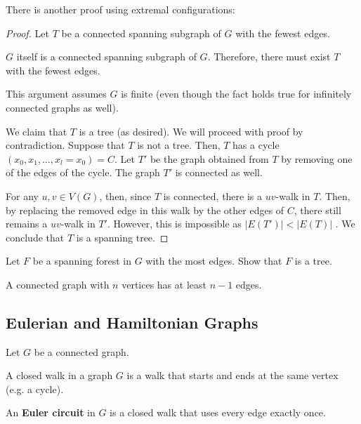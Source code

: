 \documentclass[a4paper]{article}
\begin{document}
There is another proof using extremal configurations:
\begin{proof}
	Let \( T \) be a connected spanning subgraph of \( G \) with the fewest edges.
	\begin{note}
		\( G \) itself is a connected spanning subgraph of \( G \). Therefore, there must exist \( T \) with the fewest edges.
	\end{note}
	\begin{remark}
		This argument assumes \( G \) is finite (even though the fact holds true for infinitely connected graphs as well).
	\end{remark}
	We claim that \( T \) is a tree (as desired). We will proceed with proof by contradiction. Suppose that \( T \) is not a tree. Then, \( T \) has a cycle \( (x_{0}, x_{1}, \ldots , x_l = x_{0}) = C\). Let \( T' \) be the graph obtained from \( T \) by removing one of the edges of the cycle. The graph \( T' \) is connected as well. \par
	For any \( u,v \in V(G) \), then, since \( T \) is connected, there is a \( uv \)-walk in \( T \). Then, by replacing the removed edge in this walk by the other edges of \( C \), there still remains a \( uv \)-walk in \( T' \). However, this is impossible as \( |E(T')| < |E(T)| \) \contra. We conclude that \( T \) is a spanning tree.
\end{proof}

Let \( F \) be a spanning forest in \( G \) with the most edges. Show that \( F \) is a tree.

\begin{corollary}
	A connected graph with \( n \) vertices has at least \( n-1 \) edges.
\end{corollary}

\subsection{Eulerian and Hamiltonian Graphs}

Let \( G \) be a connected graph.
\begin{definition}
	A closed walk in a graph \( G \) is a walk that starts and ends at the same vertex (e.g. a cycle).
\end{definition}

\begin{definition}
	An \textbf{Euler circuit} in \( G \) is a closed walk that uses every edge exactly once.
\end{definition}
\end{document}
